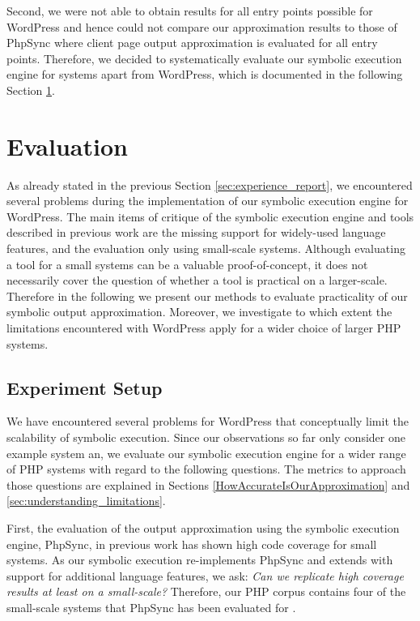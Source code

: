 \documentclass[sigconf]{acmart}
\renewcommand{\sf}[1]{\textsf{#1}}
\begin{document}
Second, we were not able to obtain results for all entry points possible for
\sf{WordPress} and hence could not compare our approximation results to those of
\sf{PhpSync} where client page output approximation is evaluated for all entry points. Therefore, we decided to
systematically evaluate our symbolic execution engine for systems apart from
\sf{WordPress}, which is documented in the following Section
\ref{sec:evaluation}.

\section{Evaluation} \label{sec:evaluation}
As already stated in the previous Section \ref{sec:experience_report}, we
encountered several problems during the implementation of our symbolic
execution engine for \sf{WordPress}. The main items of critique of the symbolic
execution engine and tools described in previous work
\cite{Nguyen:2011:AFH:2190078.2190142,Nguyen:2014:BCG:2635868.2635928,Nguyen:2015:CPS:2786805.2786872,Nguyen:2015:VIS:2819009.2819140}
are the missing support for widely-used language features, and the evaluation
only using small-scale systems. Although evaluating a tool for a small systems
can be a valuable proof-of-concept, it does not necessarily cover the question
of whether a tool is practical on a larger-scale. Therefore in the following we
present our methods to evaluate practicality of our symbolic output
approximation. Moreover, we investigate to which extent the limitations encountered
with \sf{WordPress} apply for a wider choice of larger PHP systems.

\subsection{Experiment Setup} \label{sec:experiment_setup}
We have encountered several problems for \sf{WordPress} that conceptually limit
the scalability of symbolic execution. Since our observations so far only consider
one example system an, we evaluate our symbolic execution engine for a wider
range of PHP systems with regard to the following questions. The metrics to
approach those questions are explained in Sections
\ref{HowAccurateIsOurApproximation} and \ref{sec:understanding_limitations}.

First, the evaluation of the output approximation using the symbolic execution
engine, \sf{PhpSync}, in previous work \cite{Nguyen:2014:BCG:2635868.2635928}
has shown high code coverage for small systems. As our symbolic execution
re-implements \sf{PhpSync} and extends with support for additional language
features, we ask: \textit{Can  we replicate high coverage results at least on a
small-scale?} Therefore, our PHP corpus contains four of the small-scale systems
that \sf{PhpSync} has been evaluated for \cite{Nguyen:2014:BCG:2635868.2635928}.
\end{document}

